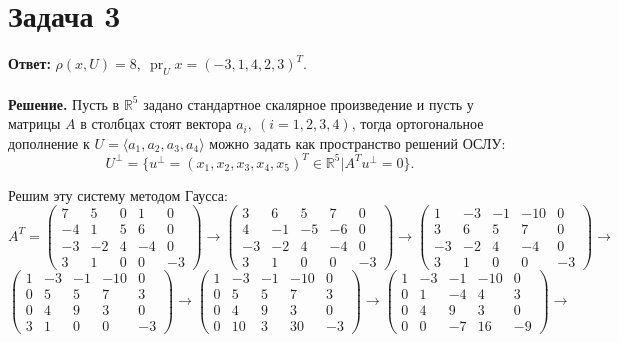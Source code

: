 \documentclass{article}
\DeclareMathOperator{\pr}{pr}
\begin{document}
\section*{Задача 3}
{\bf Ответ:} $\rho(x,U)=8,\ \pr_U x=(-3,1,4,2,3)^T$.
\\
\\
{\bf Решение.} Пусть в $\mathbb{R}^5$ задано стандартное скалярное произведение и пусть у матрицы $A$ в столбцах стоят вектора $a_i,\ (i=1,2,3,4)$, тогда ортогональное дополнение к $U=\langle a_1, a_2, a_3, a_4 \rangle$ можно задать как пространство решений ОСЛУ: 
$$U^{\bot}=\{u^{\bot}=(x_1,x_2,x_3,x_4,x_5)^T\in\mathbb{R}^5|A^Tu^{\bot}=0\}.$$
\par
Решим эту систему методом Гаусса:
$$A^T=\left(\begin{array}{rrrrr}7 & 5 & 0 & 1 & 0\\-4 & 1 & 5 & 6 & 0\\-3 & -2 & 4 & -4 & 0\\3 & 1 & 0 & 0 & -3\end{array}\right)\rightarrow\left(\begin{array}{rrrrr}3 & 6 & 5 & 7 & 0\\4 & -1 & -5 & -6 & 0\\-3 & -2 & 4 & -4 & 0\\3 & 1 & 0 & 0 & -3\end{array}\right)\rightarrow\left(\begin{array}{rrrrr}1 & -3 & -1 & -10 & 0\\3 & 6 & 5 & 7 & 0\\-3 & -2 & 4 & -4 & 0\\3 & 1 & 0 & 0 & -3\end{array}\right)\rightarrow$$
$$\left(\begin{array}{rrrrr}1 & -3 & -1 & -10 & 0\\0 & 5 & 5 & 7 & 3\\0 & 4 & 9 & 3 & 0\\3 & 1 & 0 & 0 & -3\end{array}\right)\rightarrow\left(\begin{array}{rrrrr}1 & -3 & -1 & -10 & 0\\0 & 5 & 5 & 7 & 3\\0 & 4 & 9 & 3 & 0\\0 & 10 & 3 & 30 & -3\end{array}\right)\rightarrow\left(\begin{array}{rrrrr}1 & -3 & -1 & -10 & 0\\0 & 1 & -4 & 4 & 3\\0 & 4 & 9 & 3 & 0\\0 & 0 & -7 & 16 & -9\end{array}\right)\rightarrow$$
\end{document}
